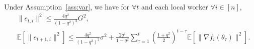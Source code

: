 \documentclass[11pt]{article}
\begin{document}

\begin{Lemma} \label{lemma:bound e_t}
Under Assumption~\ref{ass:var}, we have for $\forall t$ and each local worker $\forall i\in [n]$,
\begin{align*}
    &\|e_{t,i}\|^2\leq \frac{4q^2}{(1-q^2)^2}G^2,\\
    &\mathbb E[\|e_{t+1,i}\|^2]\leq \frac{4q^2}{(1-q^2)^2}\sigma^2 + \frac{2q^2}{1-q^2}\sum_{\tau=1}^t (\frac{1+q^2}{2})^{t-\tau} \mathbb E[\|\nabla f_i(\theta_\tau)\|^2].
\end{align*}
\end{Lemma}
\end{document}
